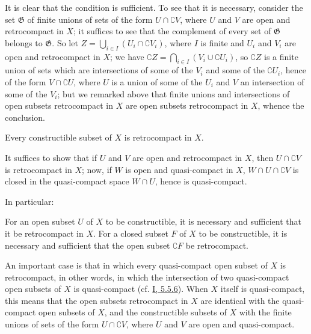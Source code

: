It is clear that the condition is sufficient. To see that it is
necessary, consider the set $\mathfrak{G}$ of finite unions
of sets of the form $U\cap\complement{V}$, where $U$ and $V$ are open and
retrocompact in $X$; it suffices to see that the complement of every
set of $\mathfrak{G}$ belongs to $\mathfrak{G}$. So let
$Z=\bigcup_{i\in I}(U_i\cap\complement{V_i})$, where $I$ is finite and $U_i$
and $V_i$ are open and retrocompact in $X$; we have
$\complement{Z}=\bigcap_{i\in I}(V_i\cup\complement{U_i})$, so
$\complement{Z}$ is a finite union of sets which are intersections of
some of the $V_i$ and some of the $\complement{U_i}$, hence
of the form
$V\cap\complement{U}$, where $U$ is a union of some of the $U_i$ and
$V$ an intersection of some of the $V_i$; but we remarked
above that finite unions and intersections of open subsets retrocompact
in $X$ are open subsets retrocompact in $X$, whence the conclusion.

\begin{corollary}[9.1.4]
\label{0.9.1.4}
Every constructible subset of $X$ is retrocompact in $X$.
\end{corollary}

It suffices to show that if $U$ and $V$ are open and retrocompact in $X$,
then $U\cap\complement{V}$ is retrocompact in $X$; now, if $W$ is open and
quasi-compact in $X$, $W\cap U\cap\complement{V}$ is closed in the
quasi-compact space $W\cap U$, hence is quasi-compact.

In particular:

\begin{corollary}[9.1.5]
\label{0.9.1.5}
For an open subset $U$ of $X$ to be constructible, it is necessary and
sufficient that it be retrocompact in $X$. For a closed subset $F$ of
$X$ to be constructible, it is necessary and sufficient that the open subset
$\complement{F}$ be retrocompact.
\end{corollary}

\begin{env}[9.1.6]
\label{0.9.1.6}
An important case is that in which every quasi-compact open subset of $X$
is retrocompact, in other words, in which the intersection of two
quasi-compact open subsets of $X$ is quasi-compact
(cf. \hyperref[I.5.5.6]{I, 5.5.6}). When $X$ itself is
quasi-compact, this means that the open subsets retrocompact in
$X$ are identical with the quasi-compact open subsets of $X$, and the
constructible subsets of $X$ with the finite unions of sets of the form
$U\cap\complement{V}$, where $U$ and $V$ are open and quasi-compact.
\end{env}

